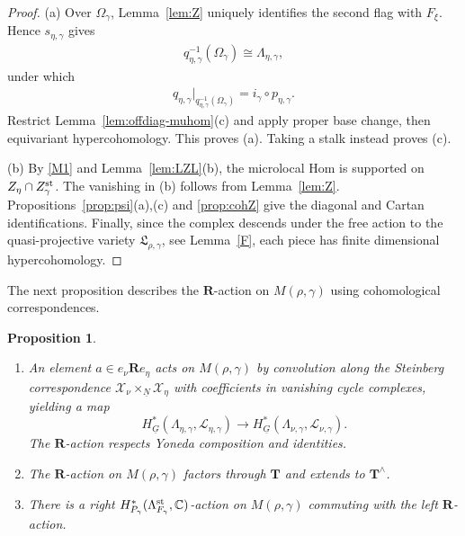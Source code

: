 \documentclass[11pt,reqno]{amsart}
\newtheorem{Proposition}[Theorem]{Proposition}
\theoremstyle{definition}
\theoremstyle{remark}
\def\bbC{\mathbb C}
\def\dN{\underline N}
\def\dG{\underline G}
\def\scrX{\mathscr X}
\def\bR{\mathbf R}
\def\bT{\mathbf T}
\begin{document}
\begin{proof}
(a) Over $\Omega_\gamma$, Lemma~\ref{lem:Z} uniquely identifies
the second flag with $F_\xi$. Hence $s_{\eta,\gamma}$ gives
\begin{align}\label{OLL1}
 q_{\eta,\gamma}^{-1}(\Omega_\gamma)\cong\Lambda_{\eta,\gamma},
\end{align}
under which
\begin{align}\label{OLL2}
 q_{\eta,\gamma}|_{q_{\eta,\gamma}^{-1}(\Omega_\gamma)}
 =i_\gamma\circ p_{\eta,\gamma}.
\end{align}
Restrict Lemma~\ref{lem:offdiag-muhom}(c) and apply proper base
change, then equivariant hypercohomology. This proves (a).
Taking a stalk instead proves (c).

(b) By \ref{M1} and Lemma~\ref{lem:LZL}(b), the
microlocal Hom is supported on $Z_\eta\cap Z_\gamma^{\rm st}$.
The vanishing in (b) follows from Lemma~\ref{lem:Z}.
Propositions~\ref{prop:psi}(a),(c) and \ref{prop:cohZ} give the
diagonal and Cartan identifications. 
Finally, since the complex descends under the free action to the quasi-projective variety
$\mathfrak L_{\rho,\gamma}$, see Lemma~\ref{F}, each piece has finite dimensional hypercohomology. 
\end{proof}

The next proposition describes the $\mathbf R$-action on $M(\rho,\gamma)$ using cohomological correspondences.

\begin{Proposition}\label{prop:microlocal-convolution}\hfill
\begin{enumerate}[label=$\mathrm{(\alph*)}$,leftmargin=8mm]
\item
An element $a\in e_\nu\bR e_\eta$ acts on $M(\rho,\gamma)$
by convolution along the Steinberg correspondence $\scrX_\nu\times_{\dN}\scrX_\eta$
with coefficients in vanishing cycle complexes, yielding a map
$$H_{\dG}^*(\Lambda_{\eta,\gamma},\mathscr L_{\eta,\gamma})
 \rightarrow
 H_{\dG}^{*}(\Lambda_{\nu,\gamma},\mathscr L_{\nu,\gamma}).$$
The $\bR$-action respects Yoneda composition and identities.

\item
The $\bR$-action on $M(\rho,\gamma)$ factors through $\bT$ and extends to $\bT^\wedge$.
\item
There is a  right $H^*_{P_\gamma}(\Lambda^{\rm st}_{F_\gamma},\bbC)$-action on $M(\rho,\gamma)$ 
commuting with the left $\bR$-action.
\end{enumerate}
\end{Proposition}
\end{document}
